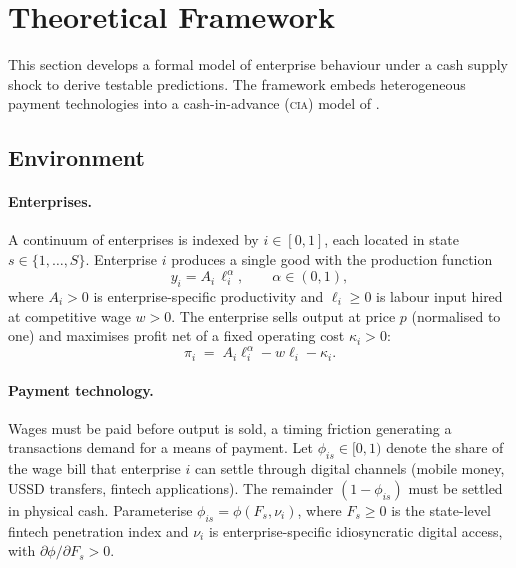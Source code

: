 
\section{Theoretical Framework}
\label{sec:theory}

This section develops a formal model of enterprise behaviour under a cash
supply shock to derive testable predictions. The framework embeds heterogeneous
payment technologies into a cash-in-advance (\textsc{cia}) model of \citet{lucas1987money}.

\subsection{Environment}

\paragraph{Enterprises.}
A continuum of enterprises is indexed by $i \in [0,1]$, each located in
state $s \in \{1,\ldots,S\}$. Enterprise $i$ produces a single good with the
production function
\begin{equation}
  y_i = A_i \,\ell_i^{\alpha}, \qquad \alpha \in (0,1),
  \label{eq:prod}
\end{equation}
where $A_i > 0$ is enterprise-specific productivity and $\ell_i \geq 0$ is
labour input hired at competitive wage $w > 0$. The enterprise sells output
at price $p$ (normalised to one) and maximises profit net of a fixed
operating cost $\kappa_i > 0$:
\begin{equation}
  \pi_i \;=\; A_i \ell_i^{\alpha} - w\ell_i - \kappa_i.
  \label{eq:profit}
\end{equation}

\paragraph{Payment technology.}
Wages must be paid before output is sold, a timing friction generating a
transactions demand for a means of payment. Let $\phi_{is} \in [0,1)$ denote
the share of the wage bill that enterprise $i$ can settle through digital
channels (mobile money, USSD transfers, fintech applications). The remainder
$(1-\phi_{is})$ must be settled in physical cash. Parameterise
$\phi_{is} = \phi(F_s, \nu_i)$, where $F_s \geq 0$ is the state-level
fintech penetration index and $\nu_i$ is enterprise-specific idiosyncratic
digital access, with $\partial\phi/\partial F_s > 0$.

